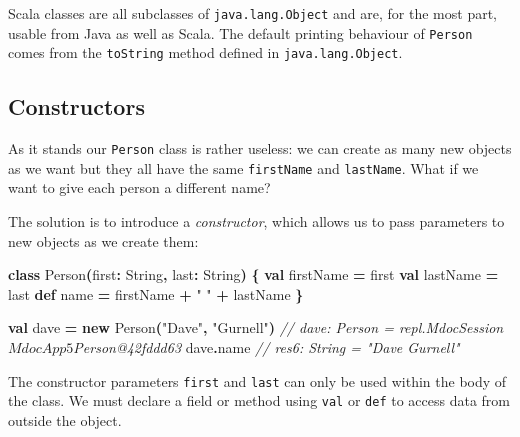 \documentclass[11pt,a5paper,]{book}
\newenvironment{Shaded}{\begin{snugshade}}{\end{snugshade}}
\newcommand{\CommentTok}[1]{\textcolor[rgb]{0.56,0.35,0.01}{\textit{#1}}}
\newcommand{\ExtensionTok}[1]{#1}
\newcommand{\FunctionTok}[1]{\textcolor[rgb]{0.00,0.00,0.00}{#1}}
\newcommand{\KeywordTok}[1]{\textcolor[rgb]{0.13,0.29,0.53}{\textbf{#1}}}
\newcommand{\NormalTok}[1]{#1}
\newcommand{\OperatorTok}[1]{\textcolor[rgb]{0.81,0.36,0.00}{\textbf{#1}}}
\newcommand{\StringTok}[1]{\textcolor[rgb]{0.31,0.60,0.02}{#1}}
\begin{document}
Scala classes are all subclasses of \texttt{java.lang.Object} and are,
for the most part, usable from Java as well as Scala. The default
printing behaviour of \texttt{Person} comes from the \texttt{toString}
method defined in \texttt{java.lang.Object}.

\hypertarget{constructors}{%
\subsection{Constructors}\label{constructors}}

As it stands our \texttt{Person} class is rather useless: we can create
as many new objects as we want but they all have the same
\texttt{firstName} and \texttt{lastName}. What if we want to give each
person a different name?

The solution is to introduce a \emph{constructor}, which allows us to
pass parameters to new objects as we create them:

\begin{Shaded}
\begin{Highlighting}[]
\KeywordTok{class} \FunctionTok{Person}\OperatorTok{(}\NormalTok{first}\OperatorTok{:} \ExtensionTok{String}\OperatorTok{,}\NormalTok{ last}\OperatorTok{:} \ExtensionTok{String}\OperatorTok{)} \OperatorTok{\{}
  \KeywordTok{val}\NormalTok{ firstName }\OperatorTok{=}\NormalTok{ first}
  \KeywordTok{val}\NormalTok{ lastName }\OperatorTok{=}\NormalTok{ last}
  \KeywordTok{def}\NormalTok{ name }\OperatorTok{=}\NormalTok{ firstName }\OperatorTok{+} \StringTok{" "} \OperatorTok{+}\NormalTok{ lastName}
\OperatorTok{\}}
\end{Highlighting}
\end{Shaded}

\begin{Shaded}
\begin{Highlighting}[]
\KeywordTok{val}\NormalTok{ dave }\OperatorTok{=} \KeywordTok{new} \FunctionTok{Person}\OperatorTok{(}\StringTok{"Dave"}\OperatorTok{,} \StringTok{"Gurnell"}\OperatorTok{)}
\CommentTok{// dave: Person = repl.MdocSession$MdocApp5$Person@42fddd63}
\NormalTok{dave}\OperatorTok{.}\NormalTok{name}
\CommentTok{// res6: String = "Dave Gurnell"}
\end{Highlighting}
\end{Shaded}

The constructor parameters \texttt{first} and \texttt{last} can only be
used within the body of the class. We must declare a field or method
using \texttt{val} or \texttt{def} to access data from outside the
object.
\end{document}
